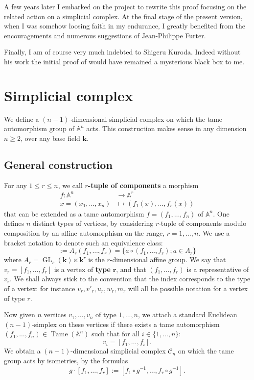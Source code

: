 \documentclass[reqno,oneside,11pt]{amsart}
\theoremstyle{plain}
\theoremstyle{definition}
\newcommand{\A}{{\mathbb{A}}}
\newcommand{\K}{\mathbf{k}}
\DeclareMathOperator{\GL}{GL}
\DeclareMathOperator{\Tame}{Tame}
\newcommand{\Comp}{\mathcal{C}}
\renewcommand{\le}{\leqslant}
\renewcommand{\ge}{\geqslant}
\begin{document}
A few years later I embarked on the project to rewrite this proof focusing on
the related action on a simplicial complex.
At the final stage of the present version, when I was somehow loosing
faith in my endurance, I greatly benefited from the encouragements and numerous
 suggestions of Jean-Philippe Furter.

Finally, I am of course very much indebted to Shigeru Kuroda.
Indeed without his
work the initial proof of \cite{SU:main} would have
remained a mysterious black box to me.

\section{Simplicial complex} \label{sec:simplicial complex}

We define a $(n-1)$-dimensional simplicial complex on which the  tame
automorphism group of $\A^n$ acts.
This construction makes sense in any dimension $n \ge 2$, over any base
field $\K$.

\subsection{General construction}

For any $1 \le r \le n$, we call \textbf{$r$-tuple of components} a morphism
\begin{align*}
f\colon\A^n &\to \A^r \\
x = (x_1, \dots, x_n) &\mapsto \left( f_1(x), \dots, f_r(x) \right)
\end{align*}
that can be extended as a tame automorphism $f = (f_1,\dots, f_n)$ of $\A^n$.
One defines $n$ distinct types of vertices, by considering $r$-tuple of
components modulo composition by an affine automorphism on the range, $r = 1,
\dots, n$.
We use a bracket notation to denote such an equivalence class:
\begin{equation*}
[f_1, \dots,f_r] := A_r (f_1, \dots, f_r) = \{ a \circ (f_1, \dots, f_r) ; a \in A_r\}
\end{equation*}
where $A_r = \GL_r(\K) \ltimes \K^r$ is the $r$-dimensional affine group.
We say that $v_r = [f_1, \dots,f_r]$ is a vertex of \textbf{type} $\boldsymbol r$, and that $(f_1, \dots, f_r)$ is a representative of $v_r$.
We shall always stick to the convention that the index corresponds to the type of a vertex: for instance $v_r, v'_r, u_r, w_r, m_r$ will all be possible notation for a vertex of type $r$.

Now given $n$ vertices $v_1, \dots, v_n$ of type $1, \dots, n$, we attach a standard Euclidean $(n-1)$-simplex on these vertices if there exists a tame automorphism $(f_1,\dots, f_n) \in \Tame(\A^n)$ such that for all $ i \in \{1, \dots, n\}$:
$$v_i = [f_1, \dots, f_i ].$$
We obtain a $(n-1)$-dimensional simplicial complex $\Comp_n$ on which the tame group acts by isometries, by the formulas
$$g\cdot [f_1,\dots,f_r] := [f_1 \circ g^{-1},\dots, f_r \circ g^{-1}].$$
\end{document}
